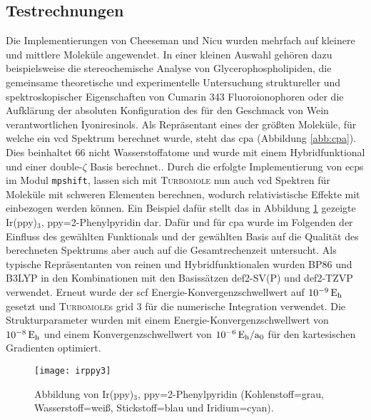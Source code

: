 	\subsection{Testrechnungen}
	Die Implementierungen von Cheeseman\supercite{cheeseman1996ab} und Nicu\supercite{nicu2008vibrational} wurden mehrfach auf kleinere und mittlere Moleküle angewendet. In einer kleinen Auswahl gehören dazu beispielsweise die stereochemische Analyse von Glycerophospholipiden\supercite{taniguchi2015stereochemical}, die gemeinsame theoretische und experimentelle Untersuchung struktureller und spektroskopischer Eigenschaften von Cumarin 343 Fluoroionophoren\supercite{botek2010theoretical} oder die Aufklärung der absoluten Konfiguration des für den Geschmack von Wein verantwortlichen Iyoniresinols.\supercite{cretin2015stereochemistry} Als Repräsentant eines der größten Moleküle, für welche ein \ac{vcd} Spektrum berechnet wurde, steht das \acf{cpa} (Abbildung \ref{abb:cpa}). Dies beinhaltet 66 nicht Wasserstoffatome und wurde mit einem Hybridfunktional und einer double-$\zeta$ Basis berechnet.\supercite{brotin2006vibrational}. Durch die erfolgte Implementierung von \acp{ecp} im Modul \texttt{mpshift}, lassen sich mit \textsc{Turbomole} nun auch \ac{vcd} Spektren für Moleküle mit schweren Elementen berechnen, wodurch relativistische Effekte mit einbezogen werden können. Ein Beispiel dafür stellt das in Abbildung \ref{abb:irppy3} gezeigte Ir(ppy)$_3$, ppy=2-Phenylpyridin dar. Dafür und für \ac{cpa} wurde im Folgenden der Einfluss des gewählten Funktionals und der gewählten Basis auf die Qualität des berechneten Spektrums aber auch auf die Gesamtrechenzeit untersucht. Als typische Repräsentanten von reinen und Hybridfunktionalen wurden BP86\supercite{perdew1986density,becke1988density} und B3LYP\supercite{becke1993density,lee1988development,stephens1994ab} in den Kombinationen mit den Basissätzen def2-SV(P) und def2-TZVP\supercite{weigend2005balanced} verwendet. Erneut wurde der \ac{scf} Energie-Konvergenzschwellwert auf $\unit[10^{-9}]{E_{\textrm{h}}}$ gesetzt und \textsc{Turbomole}s grid 3 für die numerische Integration\supercite{treutler1995efficient,treutlerphdthesis} verwendet. Die Strukturparameter wurden mit einem  Energie-Konvergenzschwellwert von $\unit[10^{-8}]{E_{\textrm{h}}}$ und einem Konvergenzschwellwert von $\unit[10^{-6}]{E_{\textrm{h}}/a_0}$ für den kartesischen Gradienten optimiert.
	
\begin{figure}[ht!]
	\centering
	\texttt{[image: irppy3]}
	\captionsetup{figurewithin = chapter}
	\captionsetup{font=small, labelfont=bf}\caption[Abbildung von Ir(ppy)$_3$]{Abbildung von Ir(ppy)$_3$, ppy=2-Phenylpyridin (Kohlenstoff=grau, Wasserstoff=weiß, Stickstoff=blau und Iridium=cyan).}
\label{abb:irppy3}
\end{figure}

